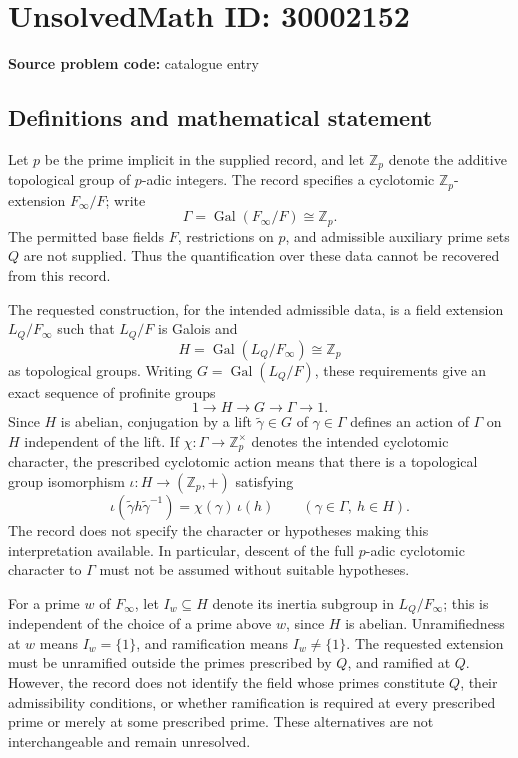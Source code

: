 \documentclass[11pt]{article}
\newcommand{\Z}{\mathbb{Z}}
\begin{document}
\section*{UnsolvedMath ID: 30002152}
\textbf{Source problem code:} catalogue entry
\subsection{Definitions and mathematical statement}
Let \(p\) be the prime implicit in the supplied record, and let \(\Z_p\) denote the additive topological group of \(p\)-adic integers. The record specifies a cyclotomic \(\Z_p\)-extension \(F_\infty/F\); write
\[
\Gamma=\operatorname{Gal}(F_\infty/F)\cong\Z_p.
\]
The permitted base fields \(F\), restrictions on \(p\), and admissible auxiliary prime sets \(Q\) are not supplied. Thus the quantification over these data cannot be recovered from this record.

The requested construction, for the intended admissible data, is a field extension \(L_Q/F_\infty\) such that \(L_Q/F\) is Galois and
\[
H=\operatorname{Gal}(L_Q/F_\infty)\cong\Z_p
\]
as topological groups. Writing \(G=\operatorname{Gal}(L_Q/F)\), these requirements give an exact sequence of profinite groups
\[
1\longrightarrow H\longrightarrow G\longrightarrow\Gamma\longrightarrow1.
\]
Since \(H\) is abelian, conjugation by a lift \(\widetilde\gamma\in G\) of \(\gamma\in\Gamma\) defines an action of \(\Gamma\) on \(H\) independent of the lift. If \(\chi:\Gamma\to\Z_p^\times\) denotes the intended cyclotomic character, the prescribed cyclotomic action means that there is a topological group isomorphism \(\iota:H\to(\Z_p,+)\) satisfying
\[
\iota(\widetilde\gamma h\widetilde\gamma^{-1})
=\chi(\gamma)\,\iota(h)
\qquad(\gamma\in\Gamma,\ h\in H).
\]
The record does not specify the character or hypotheses making this interpretation available. In particular, descent of the full \(p\)-adic cyclotomic character to \(\Gamma\) must not be assumed without suitable hypotheses.

For a prime \(w\) of \(F_\infty\), let \(I_w\subseteq H\) denote its inertia subgroup in \(L_Q/F_\infty\); this is independent of the choice of a prime above \(w\), since \(H\) is abelian. Unramifiedness at \(w\) means \(I_w=\{1\}\), and ramification means \(I_w\ne\{1\}\). The requested extension must be unramified outside the primes prescribed by \(Q\), and ramified at \(Q\). However, the record does not identify the field whose primes constitute \(Q\), their admissibility conditions, or whether ramification is required at every prescribed prime or merely at some prescribed prime. These alternatives are not interchangeable and remain unresolved.
\end{document}
